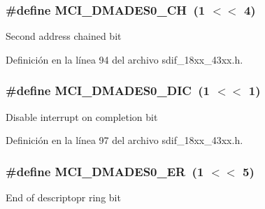 \subsubsection[{\texorpdfstring{M\+C\+I\+\_\+\+D\+M\+A\+D\+E\+S0\+\_\+\+CH}{MCI_DMADES0_CH}}]{\setlength{\rightskip}{0pt plus 5cm}\#define M\+C\+I\+\_\+\+D\+M\+A\+D\+E\+S0\+\_\+\+CH~(1 $<$$<$ 4)}\hypertarget{group___s_d_i_f__18_x_x__43_x_x_ga855ace5f638d58dbf22869f5e426e4a5}{}\label{group___s_d_i_f__18_x_x__43_x_x_ga855ace5f638d58dbf22869f5e426e4a5}
Second address chained bit 

Definición en la línea 94 del archivo sdif\+\_\+18xx\+\_\+43xx.\+h.

\subsubsection[{\texorpdfstring{M\+C\+I\+\_\+\+D\+M\+A\+D\+E\+S0\+\_\+\+D\+IC}{MCI_DMADES0_DIC}}]{\setlength{\rightskip}{0pt plus 5cm}\#define M\+C\+I\+\_\+\+D\+M\+A\+D\+E\+S0\+\_\+\+D\+IC~(1 $<$$<$ 1)}\hypertarget{group___s_d_i_f__18_x_x__43_x_x_gad22ff199990d9e28bd0ac6aa6795f21e}{}\label{group___s_d_i_f__18_x_x__43_x_x_gad22ff199990d9e28bd0ac6aa6795f21e}
Disable interrupt on completion bit 

Definición en la línea 97 del archivo sdif\+\_\+18xx\+\_\+43xx.\+h.

\subsubsection[{\texorpdfstring{M\+C\+I\+\_\+\+D\+M\+A\+D\+E\+S0\+\_\+\+ER}{MCI_DMADES0_ER}}]{\setlength{\rightskip}{0pt plus 5cm}\#define M\+C\+I\+\_\+\+D\+M\+A\+D\+E\+S0\+\_\+\+ER~(1 $<$$<$ 5)}\hypertarget{group___s_d_i_f__18_x_x__43_x_x_ga920a3926448243313844e17ebcb0772c}{}\label{group___s_d_i_f__18_x_x__43_x_x_ga920a3926448243313844e17ebcb0772c}
End of descriptopr ring bit 

